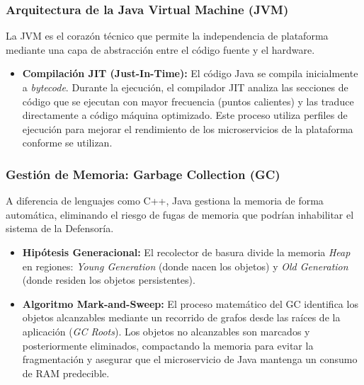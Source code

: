 \subsubsection{Arquitectura de la Java Virtual Machine (JVM)}
La JVM es el corazón técnico que permite la independencia de plataforma mediante una capa de abstracción entre el código fuente y el hardware.
\begin{itemize}
\item \textbf{Compilación JIT (Just-In-Time):} El código Java se compila inicialmente a \textit{bytecode}. Durante la ejecución, el compilador JIT analiza las secciones de código que se ejecutan con mayor frecuencia (puntos calientes) y las traduce directamente a código máquina optimizado. Este proceso utiliza perfiles de ejecución para mejorar el rendimiento de los microservicios de la plataforma conforme se utilizan.
\end{itemize}

\subsubsection{Gestión de Memoria: Garbage Collection (GC)}
A diferencia de lenguajes como C++, Java gestiona la memoria de forma automática, eliminando el riesgo de fugas de memoria que podrían inhabilitar el sistema de la Defensoría.
\begin{itemize}
\item \textbf{Hipótesis Generacional:} El recolector de basura divide la memoria \textit{Heap} en regiones: \textit{Young Generation} (donde nacen los objetos) y \textit{Old Generation} (donde residen los objetos persistentes).
\item \textbf{Algoritmo Mark-and-Sweep:} El proceso matemático del GC identifica los objetos alcanzables mediante un recorrido de grafos desde las raíces de la aplicación (\textit{GC Roots}). Los objetos no alcanzables son marcados y posteriormente eliminados, compactando la memoria para evitar la fragmentación y asegurar que el microservicio de Java mantenga un consumo de RAM predecible.
\end{itemize}

